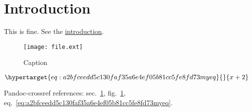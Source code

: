 \hypertarget{sec:a2bfceedd5c130faf35a6e4ef05b81cc5fe8fd73intro}{%
\section{Introduction}\label{sec:a2bfceedd5c130faf35a6e4ef05b81cc5fe8fd73intro}}

\protect\hypertarget{a2bfceedd5c130faf35a6e4ef05b81cc5fe8fd73ref}{}{This}
is fine. See the
\protect\hyperlink{sec:a2bfceedd5c130faf35a6e4ef05b81cc5fe8fd73intro}{introduction}.

\begin{figure}
\hypertarget{fig:a2bfceedd5c130faf35a6e4ef05b81cc5fe8fd73image}{%
\centering
\texttt{[image: file.ext]}
\caption{Caption}\label{fig:a2bfceedd5c130faf35a6e4ef05b81cc5fe8fd73image}
}
\end{figure}

\begin{equation}\protect\hypertarget{eq:a2bfceedd5c130faf35a6e4ef05b81cc5fe8fd73myeq}{}{x + 2}\label{eq:a2bfceedd5c130faf35a6e4ef05b81cc5fe8fd73myeq}\end{equation}

Pandoc-crossref references:
sec.~\ref{sec:a2bfceedd5c130faf35a6e4ef05b81cc5fe8fd73intro},
fig.~\ref{fig:a2bfceedd5c130faf35a6e4ef05b81cc5fe8fd73image},
eq.~\ref{eq:a2bfceedd5c130faf35a6e4ef05b81cc5fe8fd73myeq}.
